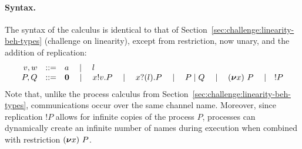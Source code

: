 \paragraph{Syntax.}
The syntax of the calculus is identical to that of
Section~\ref{sec:challenge:linearity-beh-types} (challenge on
linearity), except from restriction, now unary, and the addition of
replication:
\begin{displaymath}
  \begin{array}{rcl}
    v,w & ::= & a \quad\mid\quad l \\
    P,Q & ::=& \bm{0}
               \quad \mid\quad x ! v . P
               \quad \mid\quad x ? (l) . P
               \quad \mid\quad P \mid Q
               \quad \mid\quad (\bm{\nu} x)~{P}
               \quad \mid\quad !P
  \end{array}
\end{displaymath}
Note that, unlike the process calculus from
Section~\ref{sec:challenge:linearity-beh-types}, communications occur
over the same channel name. Moreover, since replication $!P$ allows
for infinite copies of the process $P$, processes can dynamically
create an infinite number of names during execution when combined with
restriction $(\bm{\nu} x)~{P}$.
%
